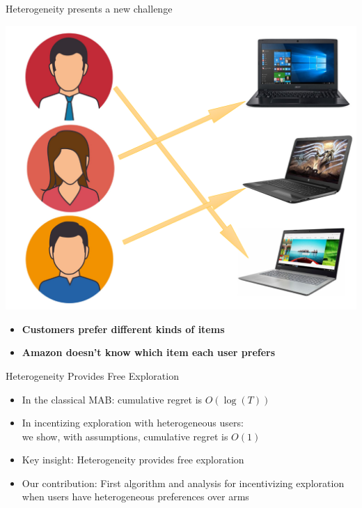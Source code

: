 \documentclass[serif]{beamer}
\begin{document}
\begin{frame}{Heterogeneity presents a new challenge}
\begin{center}
\includegraphics[scale=0.35]{example2}
\end{center}
\begin{itemize}
\item \textbf{Customers prefer different kinds of items}
\item \textbf{Amazon doesn't know which item each user prefers}
\end{itemize}

\end{frame}




\begin{frame}{Heterogeneity Provides Free Exploration}
\begin{itemize} [label=\textbullet]
\item In the classical MAB: cumulative regret is $O(\log(T))$
\item In incentizing exploration with heterogeneous users:\\ we show, with assumptions, cumulative regret is $O(1)$
\item Key insight: Heterogeneity provides free exploration
\item Our contribution: First algorithm and analysis for incentivizing exploration when users have heterogeneous preferences over arms
\end{itemize}
\end{frame}
\end{document}
